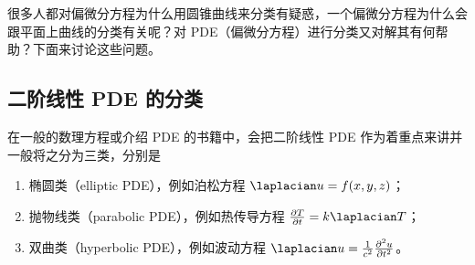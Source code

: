 
\begin{issues}
\issueMissDepend
\issueTODO
\issueDraft
\end{issues}

很多人都对偏微分方程为什么用圆锥曲线来分类有疑惑，一个偏微分方程为什么会跟平面上曲线的分类有关呢？对 PDE（偏微分方程）进行分类又对解其有何帮助？下面来讨论这些问题。

\subsection{二阶线性 PDE 的分类}
在一般的数理方程或介绍 PDE 的书籍中，会把二阶线性 PDE 作为着重点来讲并一般将之分为三类，分别是
\begin{enumerate}
\item 椭圆类（elliptic PDE），例如泊松方程 $\laplacian u = f(x,y,z)$；
\item 抛物线类（parabolic PDE），例如热传导方程 $\frac{\partial T}{\partial t} = k \laplacian T$；
\item 双曲类（hyperbolic PDE），例如波动方程 $\laplacian u = \frac{1}{c^2} \frac{\partial^2 u}{\partial t^2}$。
\end{enumerate}